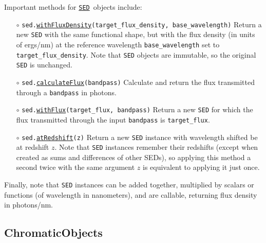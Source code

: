 \documentclass[preprint,10pt]{../../devel/modules/aastex}
\newcommand\SED{\href{http://galsim-developers.github.io/GalSim/classgalsim_1_1sed_1_1_s_e_d.html}{\texttt{SED}}}
\begin{document}
Important methods for \SED\ objects include:
\begin{itemize}
  \item[$\circ$]
  \texttt{sed.\href{http://galsim-developers.github.io/GalSim/classgalsim_1_1sed_1_1_s_e_d.html\#abd38352d0cd9327ba255b8f327562992}{withFluxDensity}(target\_flux\_density,
    base\_wavelength)} 
      \newline 
      Return a new \texttt{SED} with the same functional shape, 
      but with the flux
      density (in units of ergs/nm) at the reference
      wavelength \texttt{base\_wavelength} set to
      \texttt{target\_flux\_density}.  Note that \texttt{SED} objects are
      immutable, so the original \texttt{SED} is unchanged.
  \item[$\circ$]
  \texttt{sed.\href{http://galsim-developers.github.io/GalSim/classgalsim_1_1sed_1_1_s_e_d.html\#ab20b0c861f5b6a6604fe838b83a4d6cc}{calculateFlux}(bandpass)}
    \newline 
    Calculate and return the flux transmitted through a
    \texttt{bandpass} in photons.
  \item[$\circ$]
  \texttt{sed.\href{http://galsim-developers.github.io/GalSim/classgalsim_1_1sed_1_1_s_e_d.html\#a33613fdc3b0f99534971e9651ea2e659}{withFlux}(target\_flux, bandpass)}
    \newline 
    Return a new \texttt{SED}
    for which the flux transmitted through the input \texttt{bandpass} is \texttt{target\_flux}.
  \item[$\circ$]
  \texttt{sed.\href{http://galsim-developers.github.io/GalSim/classgalsim_1_1sed_1_1_s_e_d.html\#a9d49d109ff539f61ab022e1be6391b12}{atRedshift}(z)}
    \newline 
    Return a new \texttt{SED} instance with wavelength shifted be at redshift $z$.
    Note that \texttt{SED} instances remember their redshifts (except when created as sums and 
    differences of
    other SEDs), so applying this method a second twice with the same argument $z$ is equivalent 
    to applying it just once.
\end{itemize}

Finally, note that \texttt{SED} instances can be added together, multiplied by scalars or functions
(of wavelength in nanometers), and are callable, returning flux density in photons/nm.

\subsection{ChromaticObjects}
\end{document}
